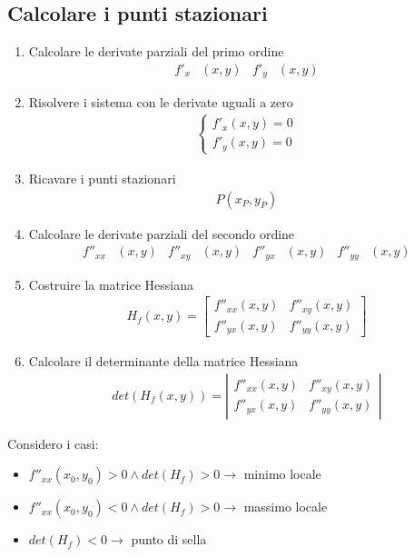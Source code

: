 \documentclass[a4paper]{article}
\begin{document}
	\subsection*{Calcolare i punti stazionari}
	\begin{enumerate}
		\item Calcolare le derivate parziali del primo ordine
			\begin{align*}
				f'_x&(x,y)	&	f'_y&(x,y)
			\end{align*}
		\item Risolvere i sistema con le derivate uguali a zero
			\begin{align*}
				\begin{cases}
				f'_x(x,y)=0\\
				f'_y(x,y)=0
				\end{cases}
			\end{align*}
		\item Ricavare i punti stazionari
			\begin{align*}
				P(x_P,y_P)
			\end{align*}
		\item Calcolare le derivate parziali del secondo ordine
			\begin{align*}
				f''_{xx}&(x,y)	&	f''_{xy}&(x,y)	&	f''_{yx}&(x,y)	&	f''_{yy}&(x,y)
			\end{align*}
		\item Costruire la matrice Hessiana
			\begin{align*}
				H_f(x,y) = \left[
				\begin{array}{cc}
				f''_{xx}(x,y) & f''_{xy}(x,y) \\ 
				f''_{yx}(x,y) & f''_{yy}(x,y)
				\end{array} \right]
			\end{align*}
		\item Calcolare il determinante della matrice Hessiana
			\begin{align*}
				det(H_f(x,y)) = \left|
				\begin{array}{cc}
				f''_{xx}(x,y) & f''_{xy}(x,y) \\ 
				f''_{yx}(x,y) & f''_{yy}(x,y)
				\end{array} \right|
				\end{align*}
			\end{enumerate}
		Considero i casi:\\
			\begin{itemize}
				\item $f''_{xx}(x_0,y_0) > 0 \wedge det(H_f) > 0 \to $ minimo locale
				\item $f''_{xx}(x_0,y_0) < 0 \wedge det(H_f) > 0 \to $ massimo locale
				\item $det(H_f) < 0 \to $ punto di sella
			\end{itemize}
			\newpage
\end{document}
